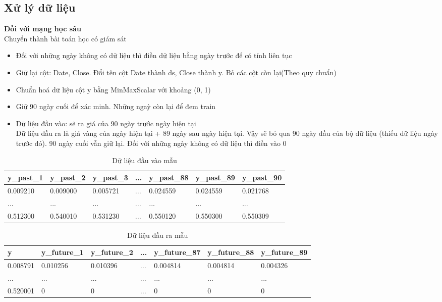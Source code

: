 \subsection{Xử lý dữ liệu}

\textbf{Đối với mạng học sâu} \\
Chuyển thành bài toán học có giám sát
\begin{itemize}
    \item Đối với những ngày không có dữ liệu thì điền dữ liệu bằng ngày trước để có tính liên tục \\
    \item Giữ lại cột: Date, Close. Đổi tên cột Date thành ds, Close thành y. Bỏ các cột còn lại(Theo quy chuẩn) \\
    \item Chuẩn hoá dữ liệu cột y bằng MinMaxScalar với khoảng (0, 1) \\
    \item Giữ 90 ngày cuối để xác minh. Những ngaỳ còn lại để đem train \\
    \item Dữ liệu đầu vào: sẽ ra giá của 90 ngày trước ngày hiện tại \\
    Dữ liệu đầu ra là giá vàng của ngày hiện tại +  89 ngày sau ngày hiện tại. Vậy sẽ bỏ qua 90 ngày đầu của bộ dữ liệu (thiếu dữ liệu ngày trước đó). 90 ngày cuối vẫn giữ lại. Đối với những ngày không có dữ liệu thì điền vào 0 \\
\end{itemize}
\begin{table}[h]
	\begin{tabularx}{\textwidth}{X | X | X | X | X | X | X } 
		y\_past\_1	& y\_past\_2	 & y\_past\_3	& ...	& y\_past\_88	 & y\_past\_89	 & y\_past\_90 		\\ \hline
		0.009210	& 0.009000	& 0.005721	& ... & 0.024559	& 0.024559	& 0.021768\\ \hline
		...	& ...	& ...	& ... & ...	& ...	& ... \\ \hline
		0.512300	& 0.540010	& 0.531230	& ... & 0.550120	& 0.550300	& 0.550309\\ %
	\end{tabularx}
	\label{tab:table_input}
	\caption{Dữ liệu đầu vào mẫu}
\end{table}
\begin{table}[h]
	\begin{tabularx}{\textwidth}{X | X | X | X | X | X | X } 
		y	& y\_future\_1 & y\_future\_2	& ...	& y\_future\_87	 & y\_future\_88	 & y\_future\_89		\\ \hline
		0.008791	& 0.010256	& 0.010396		& ... & 0.004814	& 0.004814	& 0.004326\\ \hline
		...	& ...	& ...	& ... & ...	& ...	& ... \\ \hline
		0.520001	& 0	& 0		& ... & 0	& 0	& 0\\ %
\end{tabularx}
	\label{tab:table_output}
	\caption{Dữ liệu đầu ra mẫu}
\end{table}


